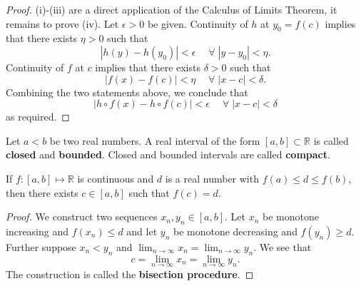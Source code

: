 \begin{proof}
    (i)-(iii) are a direct application of the Calculus of Limits Theorem, it remains to prove (iv). Let $\epsilon>0$ be given. Continuity of $h$ at $y_0=f(c)$ implies that there exists $\eta>0$ such that \[|h(y)-h(y_0)|<\epsilon\quad\;\forall\;|y-y_0|<\eta.\] Continuity of $f$ at $c$ implies that there exists $\delta>0$ such that \[|f(x)-f(c)|<\eta\quad\;\forall\;|x-c|<\delta.\] Combining the two statements above, we conclude that \[|h\circ f(x)-h\circ f(c)|<\epsilon\quad\;\forall\;|x-c|<\delta\] as required.
\end{proof}

\begin{definition}
    Let $a < b$ be two real numbers. A real interval of the form $[a, b] \subset \mathbb{R}$ is called \textbf{closed} and \textbf{bounded}. Closed and bounded intervals are called \textbf{compact}.
\end{definition}

\begin{theorem}
    If $f : [a, b] \mapsto \mathbb{R}$ is continuous and $d$ is a real number with $f(a) \leq d \leq f(b)$, then there exists $c \in [a, b]$ such that $f(c) = d$.
\end{theorem}

\begin{proof}
    We construct two sequences $x_n, y_n \in [a, b]$. Let $x_n$ be monotone increasing and $f(x_n) \leq d$ and let $y_n$ be monotone decreasing and $f(y_n) \geq d$. Further suppose $x_n < y_n$ and $\lim_{n \to \infty} x_n = \lim_{n \to \infty} y_n$. We see that \[c = \lim_{n \to \infty} x_n = \lim_{n \to \infty} y_n.\] The construction is called the \textbf{bisection procedure}.
\end{proof}

